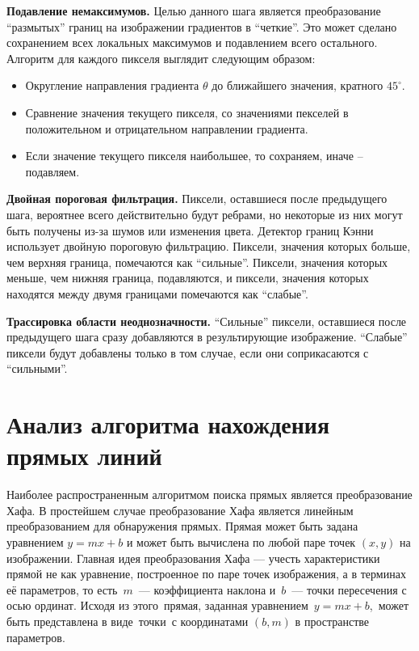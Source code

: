 \textbf{Подавление немаксимумов.} 
Целью данного шага является преобразование ``размытых'' границ на изображении градиентов в ``четкие''. Это может сделано сохранением всех локальных максимумов и подавлением всего остального. Алгоритм для каждого пикселя выглядит следующим образом:
\begin{itemize}
	\item Округление направления градиента \(\theta\) до ближайшего значения, кратного \(45^\circ\).
	\item Сравнение значения текущего пикселя, со значениями пекселей в положительном и отрицательном направлении градиента.
	\item Если значение текущего пикселя наибольшее, то сохраняем, иначе -- подавляем.
\end{itemize}

\textbf{Двойная пороговая фильтрация.} 
Пиксели, оставшиеся после предыдущего шага, вероятнее всего действительно будут ребрами, но некоторые из них могут быть получены из-за шумов или изменения цвета. Детектор границ Кэнни использует двойную пороговую фильтрацию. Пиксели, значения которых больше, чем верхняя граница, помечаются как ``сильные''. Пиксели, значения которых меньше, чем нижняя граница, подавляются, и пиксели, значения которых находятся между двумя границами помечаются как ``слабые''.

\textbf{Трассировка области неоднозначности.}
``Сильные'' пиксели, оставшиеся после предыдущего шага сразу добавляются в результирующие изображение. ``Слабые'' пиксели будут добавлены только в том случае, если они соприкасаются с ``сильными''.

\section{Анализ алгоритма нахождения прямых линий}
Наиболее распространенным алгоритмом поиска прямых является преобразование Хафа.
В простейшем случае преобразование Хафа является линейным преобразованием для обнаружения прямых. Прямая может быть задана уравнением \(y = mx + b\) и может быть вычислена по любой паре точек \((x, y)\) на изображении. Главная идея преобразования Хафа — учесть характеристики прямой не как уравнение, построенное по паре точек изображения, а в терминах её параметров, то есть \(m\) — коэффициента наклона и \(b\) — точки пересечения с осью ординат. Исходя из этого прямая, заданная уравнением \(y = mx + b\), может быть представлена в виде точки с координатами \((b, m)\) в пространстве параметров.

